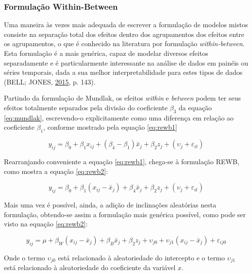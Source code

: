 \documentclass[
  a4paper, 11pt]{article}
\begin{document}
\hypertarget{formulauxe7uxe3o-within-between}{%
\subsubsection{Formulação
Within-Between}\label{formulauxe7uxe3o-within-between}}

Uma maneira às vezes mais adequada de escrever a formulação de modelos
mistos consiste na separação total dos efeitos dentro dos agrupamentos
dos efeitos entre os agrupamentos, o que é conhecido na literatura por
formulação \emph{within-between}. Esta formulação é a mais genérica,
capaz de modelar diversos efeitos separadamente e é particularmente
interessante na análise de dados em painéis ou séries temporais, dada a
sua melhor interpretabilidade para estes tipos de dados (BELL; JONES,
\protect\hyperlink{ref-bell2015}{2015}, p. 143).

Partindo da formulação de Mundlak, os efeitos \emph{within} e
\emph{between} podem ter seus efeitos totalmente separados pela divisão
do coeficiente \(\beta_3\) da equação \ref{eq:mundlak}, escrevendo-o
explicitamente como uma diferença em relação ao coeficiente \(\beta_1\),
conforme mostrado pela equação \ref{eq:rewb1}

\begin{equation} \label{eq:rewb1}
y_{ij} = \beta_0 + \beta_1 x_{ij} + (\beta_{4} - \beta_1) \bar{x}_j+ \beta_2 z_j + (\upsilon_j + \varepsilon_{it}) 
\end{equation}

Rearranjando conveniente a equação \ref{eq:rewb1}, chega-se à formulação
REWB, como mostra a equação \ref{eq:rewb2}:

\begin{equation} \label{eq:rewb1}
y_{ij} = \beta_0 + \beta_1 (x_{ij} - \bar{x}_j) + \beta_4 \bar{x}_j+ \beta_2 z_j + (\upsilon_j + \varepsilon_{it}) 
\end{equation}

Mais uma vez é possível, ainda, a adição de inclinações aleatórias nesta
formulação, obtendo-se assim a formulação mais genérica possível, como
pode ser visto na equação \ref{eq:rewb2}:

\begin{equation} \label{eq:rewb2}
y_{ij} = \mu + \beta_{W} (x_{ij} - \bar{x}_j) + \beta_{B}\bar{x}_j+ 
\beta_2 z_j + \upsilon_{j0} + \upsilon_{j1} (x_{ij} - \bar{x}_j) + \varepsilon_{ij0} 
\end{equation}

Onde o termo \(\upsilon_{j0}\) está relacionado à aleatoriedade do
intercepto e o termo \(\upsilon_{j1}\) está relacionado à aleatoriedade
do coeficiente da variável \(x\).
\end{document}
